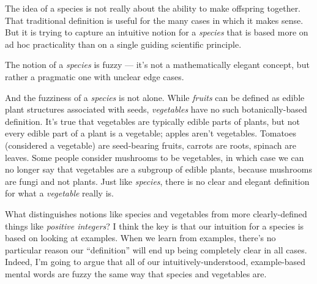 \documentclass[11pt, oneside]{article}   	%
\begin{document}
The idea of a species is not really about the ability to make
offspring together.
That traditional definition is useful for the many cases in which it
makes sense.
But it is trying to capture an
intuitive notion for a {\em species} that is
based more on ad hoc practicality than on a single guiding scientific principle.

The notion of a {\em species} is fuzzy --- it's not a mathematically elegant
concept, but rather a pragmatic one with unclear edge cases.

And the fuzziness of a {\em species} is not alone. While {\em fruits} can be
defined as edible plant structures associated with seeds,
{\em vegetables} have no such botanically-based definition.
It's true that vegetables are typically edible parts of plants,
but not every edible part of a plant is a vegetable;
apples aren't vegetables.
Tomatoes (considered a vegetable) are seed-bearing fruits, carrots are roots,
spinach are leaves. Some people consider mushrooms to be vegetables, in which
case we can no longer say that vegetables are a subgroup of edible plants,
because mushrooms are fungi and not plants.
Just like {\em species}, there is no clear and elegant definition for what a
{\em vegetable} really is.

What distinguishes notions like species and vegetables from
more clearly-defined
things like
{\em positive integers}?
I think the key is that our intuition for a species is based on looking at
examples. When we learn from examples, there's no particular reason our
``definition'' will end up being completely clear in all cases.
Indeed, I'm going to argue that all of our
intuitively-understood, example-based mental words are fuzzy the same way that
species and vegetables are.
\end{document}
